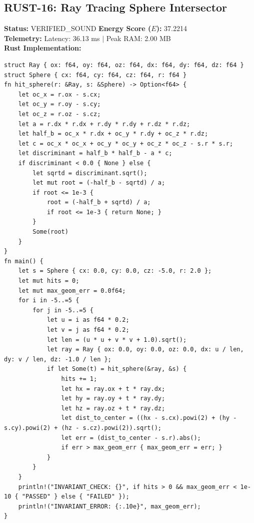 \documentclass[11pt, a4paper]{article}
\begin{document}
\subsection{RUST-16: Ray Tracing Sphere Intersector}
\textbf{Status:} VERIFIED\_SOUND \hfill \textbf{Energy Score ($E$):} 37.2214\\
\textbf{Telemetry:} Latency: 36.13 ms $|$ Peak RAM: 2.00 MB\\
\textbf{Rust Implementation:}
\begin{verbatim}
struct Ray { ox: f64, oy: f64, oz: f64, dx: f64, dy: f64, dz: f64 }
struct Sphere { cx: f64, cy: f64, cz: f64, r: f64 }
fn hit_sphere(r: &Ray, s: &Sphere) -> Option<f64> {
    let oc_x = r.ox - s.cx;
    let oc_y = r.oy - s.cy;
    let oc_z = r.oz - s.cz;
    let a = r.dx * r.dx + r.dy * r.dy + r.dz * r.dz;
    let half_b = oc_x * r.dx + oc_y * r.dy + oc_z * r.dz;
    let c = oc_x * oc_x + oc_y * oc_y + oc_z * oc_z - s.r * s.r;
    let discriminant = half_b * half_b - a * c;
    if discriminant < 0.0 { None } else {
        let sqrtd = discriminant.sqrt();
        let mut root = (-half_b - sqrtd) / a;
        if root <= 1e-3 {
            root = (-half_b + sqrtd) / a;
            if root <= 1e-3 { return None; }
        }
        Some(root)
    }
}
fn main() {
    let s = Sphere { cx: 0.0, cy: 0.0, cz: -5.0, r: 2.0 };
    let mut hits = 0;
    let mut max_geom_err = 0.0f64;
    for i in -5..=5 {
        for j in -5..=5 {
            let u = i as f64 * 0.2;
            let v = j as f64 * 0.2;
            let len = (u * u + v * v + 1.0).sqrt();
            let ray = Ray { ox: 0.0, oy: 0.0, oz: 0.0, dx: u / len, dy: v / len, dz: -1.0 / len };
            if let Some(t) = hit_sphere(&ray, &s) {
                hits += 1;
                let hx = ray.ox + t * ray.dx;
                let hy = ray.oy + t * ray.dy;
                let hz = ray.oz + t * ray.dz;
                let dist_to_center = ((hx - s.cx).powi(2) + (hy - s.cy).powi(2) + (hz - s.cz).powi(2)).sqrt();
                let err = (dist_to_center - s.r).abs();
                if err > max_geom_err { max_geom_err = err; }
            }
        }
    }
    println!("INVARIANT_CHECK: {}", if hits > 0 && max_geom_err < 1e-10 { "PASSED" } else { "FAILED" });
    println!("INVARIANT_ERROR: {:.10e}", max_geom_err);
}
\end{verbatim}
\end{document}
